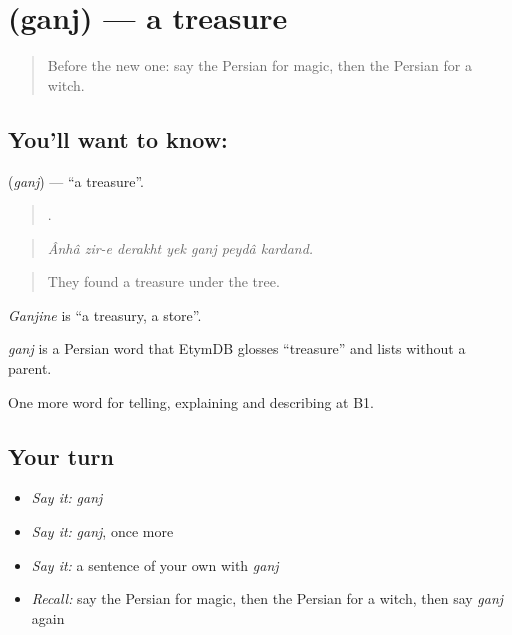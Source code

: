 \section[\texorpdfstring{\fa{گنج} (ganj)}{گنج (ganj)}]{ (ganj) — a treasure}

\label{lesson:FA-C348-ganj}



\begin{quote}
Before the new one: say the Persian for magic, then the Persian for a witch.
\end{quote}

\subsection*{You'll want to know: }
\textbf{} (\emph{ganj}) — \textquotedblleft{}a treasure\textquotedblright{}.

\begin{quote}
      .
\end{quote}

\begin{quote}
\emph{Ânhâ zir-e derakht yek ganj peydâ kardand.}
\end{quote}

\begin{quote}
They found a treasure under the tree.
\end{quote}

\emph{Ganjine} is \textquotedblleft{}a treasury, a store\textquotedblright{}.

\begin{cousinweb}
\emph{ganj} is a Persian word that EtymDB glosses \textquotedblleft{}treasure\textquotedblright{} and lists without a parent.
\end{cousinweb}

\begin{grammarlens}[title={What you've built}]
One more word for telling, explaining and describing at B1.
\end{grammarlens}

\subsection*{Your turn}
\begin{itemize}
\raggedright
  \item \emph{Say it:} \emph{ganj}
  \item \emph{Say it:} \emph{ganj}, once more
  \item \emph{Say it:} a sentence of your own with \emph{ganj}
  \item \emph{Recall:} say the Persian for magic, then the Persian for a witch, then say \emph{ganj} again
\end{itemize}

